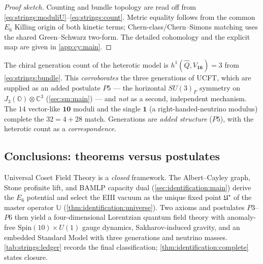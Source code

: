 \begin{proof}[Proof sketch]
Counting and bundle topology are read off from
\eqref{eq:strings:moduliU}--\eqref{eq:strings:count}. Metric equality
follows from the common $E_{6}$ Killing origin of both kinetic terms;
Chern-class/Chern--Simons matching uses the shared Green--Schwarz
two-form. The detailed cohomology and the explicit map are given in
\autoref{app:cy:main}.
\end{proof}

\begin{remark}
\label{rem:strings:gen}
The chiral generation count of the heterotic model is
$h^{1}(\widehat{Q},V_{\mathbf{16}})=3$ from \eqref{eq:strings:bundle}.
This \emph{corroborates} the three generations of UCFT, which are
supplied as an added postulate $P5$ --- the horizontal $SU(3)_{F}$
symmetry on $J_{3}(\mathbb{O})\otimes\mathbb{C}^{3}$
(\autoref{sec:sm:main}) --- and \emph{not} as a second, independent
mechanism. The $14$ vector-like $\mathbf{10}$ moduli and the single
$\mathbf{1}$ (a right-handed-neutrino modulus) complete the
$32=4+28$ match. Generations are \emph{added structure} ($P5$), with the
heterotic count as a \emph{correspondence}.
\end{remark}

\subsection{Conclusions: theorems versus postulates}
\label{sec:strings:conclusions}

Universal Coset Field Theory is a \emph{closed} framework. The Albert--Cayley
graph, Stone profinite lift, and BAMLP capacity dual
(\autoref{sec:identification:main}) derive the $E_6$ potential and select the
EIII vacuum as the unique fixed point $\mathfrak{U}^\star$ of the master
operator $\mathbb{U}$ (\autoref{thm:identification:universe}). Two axioms and
postulates $P3$--$P6$ then yield a four-dimensional Lorentzian quantum field
theory with anomaly-free $\mathrm{Spin}(10)\times U(1)$ gauge dynamics,
Sakharov-induced gravity, and an embedded Standard Model with three generations
and neutrino masses. \autoref{tab:strings:ledger} records the final
classification; \autoref{thm:identification:complete} states closure.

